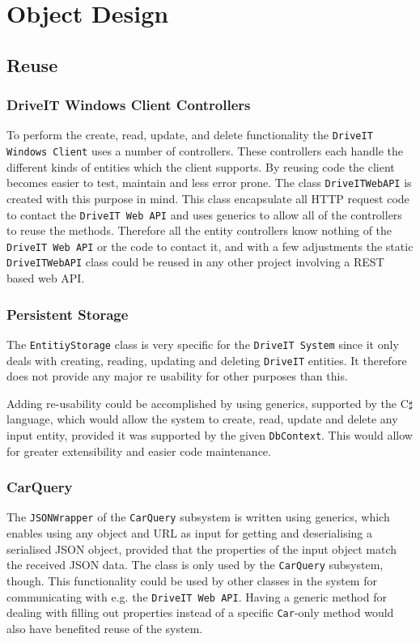 \section{Object Design}
\subsection{Reuse}
\subsubsection{DriveIT Windows Client Controllers}
To perform the create, read, update, and delete functionality the \texttt{DriveIT Windows Client} uses a number of controllers. These controllers each handle the different kinds of entities which the client supports. By reusing code the client becomes easier to test, maintain and less error prone. The class \texttt{DriveITWebAPI} is created with this purpose in mind. This class encapsulate all HTTP request code to contact the \texttt{DriveIT Web API} and uses generics to allow all of the controllers to reuse the methods. 
Therefore all the entity controllers know nothing of the \texttt{DriveIT Web API} or the code to contact it, and with a few adjustments the static \texttt{DriveITWebAPI} class could be reused in any other project involving a REST based web API.

\subsubsection{Persistent Storage}
The \texttt{EntitiyStorage} class is very specific for the \texttt{DriveIT System} since it only deals with creating, reading, updating and deleting \texttt{DriveIT} entities. It therefore does not provide any major re usability for other purposes than this. 

Adding re-usability could be accomplished by using generics, supported by the C$\sharp$ language, which would allow the system to create, read, update and delete any input entity, provided it was supported by the given \texttt{DbContext}. This would allow for greater extensibility and easier code maintenance.

\subsubsection{CarQuery}
The \texttt{JSONWrapper} of the \texttt{CarQuery} subsystem is written using generics, which enables using any object and URL as input for getting and deserialising a serialised JSON object, provided that the properties of the input object match the received JSON data.
The class is only used by the \texttt{CarQuery} subsystem, though. This functionality could be used by other classes in the system for communicating with e.g. the \texttt{DriveIT Web API}.
Having a generic method for dealing with filling out properties instead of a specific \texttt{Car}-only method would also have benefited reuse of the system.

